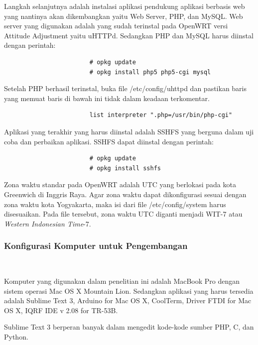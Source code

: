 				Langkah selanjutnya adalah instalasi aplikasi pendukung aplikasi berbasis web yang nantinya akan dikembangkan yaitu Web Server, PHP, dan MySQL. Web server yang digunakan adalah yang sudah terinstal pada OpenWRT versi Attitude Adjustment yaitu uHTTPd. Sedangkan PHP dan MySQL harus diinstal dengan perintah:
				\begingroup
				    \fontsize{10pt}{12pt}\selectfont
				    \begin{verbatim}
						# opkg update
						# opkg install php5 php5-cgi mysql
				    \end{verbatim}  
				\endgroup

				Setelah PHP berhasil terinstal, buka file /etc/config/uhttpd dan pastikan baris yang memuat baris di bawah ini tidak dalam keadaan terkomentar.

				\begingroup
				    \fontsize{10pt}{12pt}\selectfont
				    \centering
				    \begin{verbatim}
						list interpreter ".php=/usr/bin/php-cgi"
				    \end{verbatim}  
				\endgroup					

				Aplikasi yang terakhir yang harus diinstal adalah SSHFS yang berguna dalam uji coba dan perbaikan aplikasi. SSHFS dapat diinstal dengan perintah:
				\begingroup
				    \fontsize{10pt}{12pt}\selectfont
				    \begin{verbatim}
						# opkg update
						# opkg install sshfs
				    \end{verbatim}  
				\endgroup

				Zona waktu standar pada OpenWRT adalah UTC yang berlokasi pada kota Greenwich di Inggris Raya. Agar zona waktu dapat dikonfigurasi sesuai dengan zona waktu kota Yogyakarta, maka isi dari file /etc/config/system harus disesuaikan. Pada file tersebut, zona waktu UTC diganti menjadi WIT-7 atau \emph{Western Indonesian Time}-7.

			\subsubsection{Konfigurasi Komputer untuk Pengembangan} \

				Komputer yang digunakan dalam penelitian ini adalah MacBook Pro dengan sistem operasi Mac OS X Mountain Lion. Sedangkan aplikasi yang harus tersedia adalah Sublime Text 3, Arduino for Mac OS X, CoolTerm, Driver FTDI for Mac OS X, IQRF IDE v 2.08 for TR-53B.

				Sublime Text 3 berperan banyak dalam mengedit kode-kode sumber PHP, C, dan Python.


